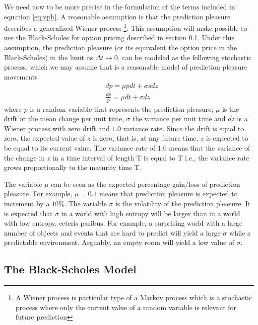 \documentclass[11pt, onecolumn]{article}
\begin{document}
We need now to be more precise in the formulation of the terms included in equation \ref{eq:vpb}. A reasonable assumption is that the prediction pleasure describes a generalized Wiener process \footnote{A Wiener process is particular type of a Markov process which is a stochastic process where only the current value of a random variable is relevant for future prediction}. This assumption will make possible to use the  Black-Scholes for option pricing described in section \ref{ss:bsm}. 
Under this assumption, the prediction pleasure (or its equivalent the option price in the Black-Scholes) in the limit as $\Delta t \to 0$, can be modeled as the following stochastic process, which we may assume that is a reasonable model of prediction pleasure movements
\begin{equation*}
\begin{split}
& dp = \mu p dt + \sigma s dz \\
& \frac{dp}{p}= \mu dt + \sigma dz
\end{split}
\label{eq:wiener}
\end{equation*}
where $p$ is a random variable that represents the prediction pleasure, $\mu$ is the drift or the mean change per unit time, $\sigma$ the variance per unit time and $dz$ is a Wiener process with zero drift and $1.0$ variance rate. Since the drift is equal to zero, the expected value of $z$ is zero, that is, at any future time, $z$ is expected to be equal to its current value. The variance rate of $1.0$ means that the variance of the change in $z$ in a
time interval of length T is equal to T i.e., the variance rate grows proportionally to the maturity time T. 

The variable $\mu$ can be seen as the expected percentage gain/loss of prediction pleasure. For example, $\mu = 0.1$ means that prediction pleasure is expected to increment by a $10\%$. The variable $\sigma$ is the volatility of the prediction pleasure. It is expected that $\sigma$ in a world with high entropy will be larger than in a world with low entropy, ceteris paribus. For example, a surprising world with a large number of objects and events that are hard to predict will yield a large $\sigma$ while a predictable environment. Arguably, an empty room will yield a low value of $\sigma$. 


\subsection{The Black-Scholes Model}
\label{ss:bsm}
\end{document}
